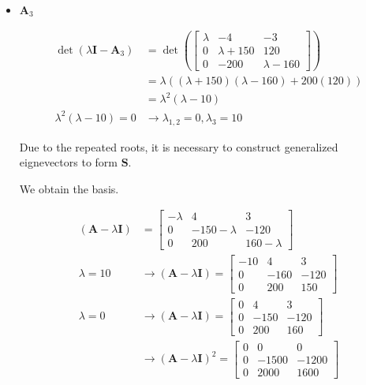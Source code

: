 \begin{itemize}
 \item $\mathbf{A}_3$

  \begin{align*}
\det(\lambda \mathbf{I} - \mathbf{A}_3) &= \det \left( \begin{bmatrix}
                                   \lambda & -4 & -3\\
                                   0 & \lambda +150 & 120\\
                                   0 & -200 & \lambda -160
                                  \end{bmatrix}
 \right)\\
 &= \lambda((\lambda +150)(\lambda -160)+200(120))\\
 &= \lambda^2(\lambda-10 )\\
 \lambda^2(\lambda-10 ) = 0 &\rightarrow \lambda_{1,2} =0, \lambda_3 = 10
 \end{align*}

 Due to the repeated roots, it is necessary to
construct generalized eignevectors to form $\mathbf{S}$.

We obtain the basis.

\begin{align*}
 (\mathbf{A}-\lambda\mathbf{I}) &= \begin{bmatrix}
                                    -\lambda & 4 & 3\\
                                    0 &  -150 - \lambda & -120\\
                                    0 & 200 & 160 -\lambda
                                   \end{bmatrix}
\\
 \lambda = 10 & \rightarrow (\mathbf{A}-\lambda\mathbf{I}) = \begin{bmatrix}
                                    -10& 4 & 3\\
                                    0 &  -160 & -120\\
                                    0 & 200 & 150
                                   \end{bmatrix}
\\
 \lambda = 0 & \rightarrow (\mathbf{A}-\lambda\mathbf{I}) = \begin{bmatrix}
                                      0 & 4 & 3\\
                                    0 &  -150 & -120\\
                                    0 & 200 & 160
                                     \end{bmatrix}\\
& \rightarrow (\mathbf{A}-\lambda\mathbf{I})^2 = \begin{bmatrix}
                                      0 & 0 & 0\\
                                      0 & -1500 &-1200\\
                                      0 & 2000 & 1600
                                     \end{bmatrix}
\end{align*}


\end{itemize}
